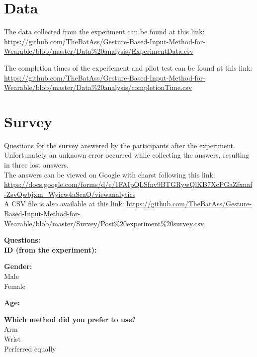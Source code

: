 \chapter{Data}\label{ex_data_appendix}
The data collected from the experiment can be found at this link:\\
\url{https://github.com/TheBatAss/Gesture-Based-Input-Method-for-Wearable/blob/master/Data\%20analysis/ExperimentData.csv}

The completion times of the experiement and pilot test can be found at this link:\\
\url{https://github.com/TheBatAss/Gesture-Based-Input-Method-for-Wearable/blob/master/Data\%20analysis/completionTime.csv}




















\chapter{Survey}\label{survey}
Questions for the survey answered by the participants after the experiment. Unfortunately an unknown error occurred while collecting the answers, resulting in three lost answers.\\
The answers can be viewed on Google with charst following this link:\\
\url{https://docs.google.com/forms/d/e/1FAIpQLSfnv9BTGRywQlKB7XcPGaZfxnaf-ZsvQwbjxm_Wyicw4aScaQ/viewanalytics}\\
A CSV file is also available at this link:
\url{https://github.com/TheBatAss/Gesture-Based-Input-Method-for-Wearable/blob/master/Survey/Post\%20experiment\%20survey.csv}

\textbf{Questions:}\\
\textbf{ID (from the experiment):}

\textbf{Gender:}\\
Male\\
Female

\textbf{Age:}

\textbf{Which method did you prefer to use?}\\
Arm\\
Wrist\\
Perferred equally

